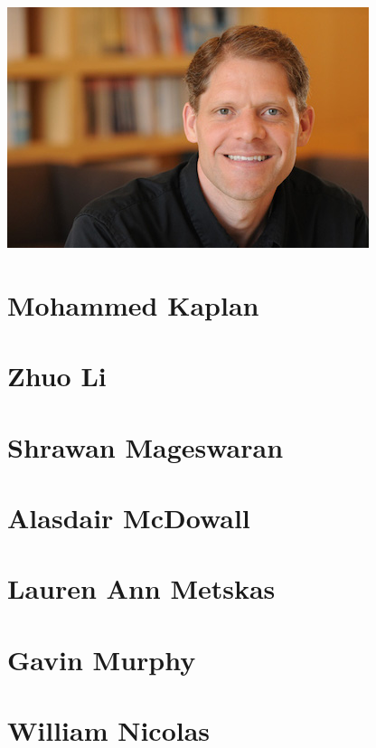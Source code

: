 \documentclass[]{tufte-book}
\begin{document}
\includegraphics{img/bios/grant_jensen}

\hypertarget{mohammed_kaplan}{\section{Mohammed
Kaplan}\label{mohammed_kaplan}}

\hypertarget{zhuo_li}{\section{Zhuo Li}\label{zhuo_li}}

\hypertarget{shrawan_mageswaran}{\section{Shrawan
Mageswaran}\label{shrawan_mageswaran}}

\hypertarget{alasdair_mcdowall}{\section{Alasdair
McDowall}\label{alasdair_mcdowall}}

\hypertarget{lauren_ann_metskas}{\section{Lauren Ann
Metskas}\label{lauren_ann_metskas}}

\hypertarget{gavin_murphy}{\section{Gavin Murphy}\label{gavin_murphy}}

\hypertarget{william_nicolas}{\section{William
Nicolas}\label{william_nicolas}}
\end{document}

